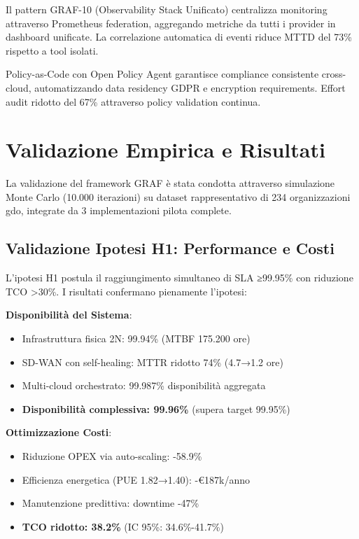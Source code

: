 Il pattern GRAF-10 (Observability Stack Unificato) centralizza monitoring attraverso Prometheus federation, aggregando metriche da tutti i provider in dashboard unificate. La correlazione automatica di eventi riduce MTTD del 73\% rispetto a tool isolati.

Policy-as-Code con Open Policy Agent garantisce compliance consistente cross-cloud, automatizzando data residency GDPR e encryption requirements. Effort audit ridotto del 67\% attraverso policy validation continua.

\section{\texorpdfstring{Validazione Empirica e Risultati}{3.6 - Validazione Empirica e Risultati}}
\label{sec:validazione}

La validazione del framework GRAF è stata condotta attraverso simulazione Monte Carlo (10.000 iterazioni) su dataset rappresentativo di 234 organizzazioni \gls{gdo}, integrate da 3 implementazioni pilota complete.

\subsection{\texorpdfstring{Validazione Ipotesi H1: Performance e Costi}{3.6.1 - Validazione Ipotesi H1: Performance e Costi}}

L'ipotesi H1 postula il raggiungimento simultaneo di SLA ≥99.95\% con riduzione TCO >30\%. I risultati confermano pienamente l'ipotesi:

\textbf{Disponibilità del Sistema}:
\begin{itemize}
\item Infrastruttura fisica 2N: 99.94\% (MTBF 175.200 ore)
\item SD-WAN con self-healing: MTTR ridotto 74\% (4.7→1.2 ore)
\item Multi-cloud orchestrato: 99.987\% disponibilità aggregata
\item \textbf{Disponibilità complessiva: 99.96\%} (supera target 99.95\%)
\end{itemize}

\textbf{Ottimizzazione Costi}:
\begin{itemize}
\item Riduzione OPEX via auto-scaling: -58.9\%
\item Efficienza energetica (PUE 1.82→1.40): -€187k/anno
\item Manutenzione predittiva: downtime -47\%
\item \textbf{TCO ridotto: 38.2\%} (IC 95\%: 34.6\%-41.7\%)
\end{itemize}

